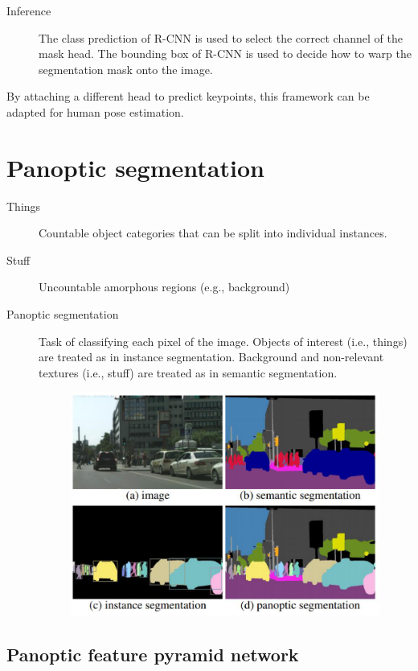 \begin{description}
\begin{description}
        \item[Inference]
            The class prediction of R-CNN is used to select the correct channel of the mask head. The bounding box of R-CNN is used to decide how to warp the segmentation mask onto the image.
    \end{description}
\end{description}

\begin{remark}
    By attaching a different head to predict keypoints, this framework can be adapted for human pose estimation.
\end{remark}



\section{Panoptic segmentation}

\begin{description}
    \item[Things] 
        Countable object categories that can be split into individual instances.

    \item[Stuff] 
        Uncountable amorphous regions (e.g., background)

    \item[Panoptic segmentation] 
        Task of classifying each pixel of the image. Objects of interest (i.e., things) are treated as in instance segmentation. Background and non-relevant textures (i.e., stuff) are treated as in semantic segmentation.

        \begin{figure}[H]
            \centering
            \includegraphics[width=0.5\linewidth]{./img/segmentation_types.png}
        \end{figure}
\end{description}


\subsection{Panoptic feature pyramid network}


